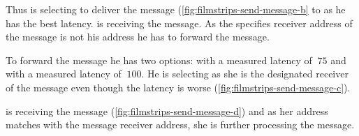 Thus \bob is selecting \don to deliver the message (\vref{fig:filmstrips-send-message-b} to \alice as he has the best latency. 
\don is receiving the message. As the specifies receiver address of the message is not his address he has to forward the message.

To forward the message he has two options: \claire with a measured latency of $\ 75 $ and \alice with a measured latency of $\ 100 $. He is selecting \alice as she is the designated receiver of the message even though the latency is worse (\vref{fig:filmstrips-send-message-c}).

\alice is receiving the message (\vref{fig:filmstrips-send-message-d}) and as her address matches with the message receiver address, she is further processing the message.